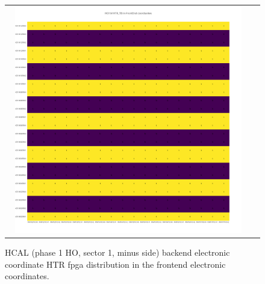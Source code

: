 \begin{figure}[htb]
 \begin{center}
  \begin{tabular}{cc}
   \includegraphics[angle=0,width=0.95\textwidth]{figures/appendix/HO1M_HTR_TB_in_FrontEnd.png}
  \end{tabular}
  \caption{HCAL (phase 1 HO, sector 1, minus side) backend electronic coordinate HTR fpga distribution in the frontend electronic coordinates.}
  \label{fig:lmapHO1MHTRTBFEC}
 \end{center}
\end{figure}
\clearpage

